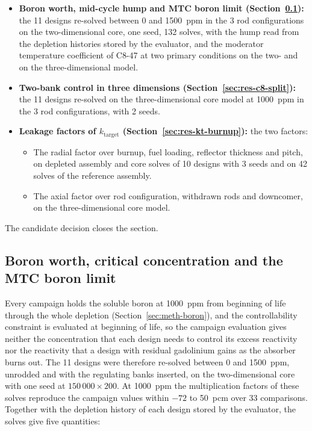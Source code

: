 \begin{itemize}
\item \textbf{Boron worth, mid-cycle hump and MTC boron limit
        (Section~\ref{sec:res-c8-boron}):} the 11 designs re-solved
        between 0 and \SI{1500}{ppm} in the 3 rod configurations on
        the two-dimensional core, one seed, 132 solves, with the hump read from the depletion histories stored by the evaluator, and the moderator
        temperature coefficient of C8-47 at two primary conditions on
        the two- and on the three-dimensional model.

\item \textbf{Two-bank control in three dimensions
        (Section~\ref{sec:res-c8-split}):} the 11 designs re-solved
        on the three-dimensional core model at \SI{1000}{ppm} in the
        3 rod configurations, with 2 seeds.

\item \textbf{Leakage factors of $k_\mathrm{target}$
        (Section~\ref{sec:res-kt-burnup}):} the two factors:
        \begin{itemize}
          \item The radial factor over burnup, fuel loading, reflector
                thickness and pitch, on depleted assembly and core solves
                of 10 designs with 3 seeds and on 42 solves of the
                reference assembly.
          \item The axial factor over rod configuration, withdrawn rods
                and downcomer, on the three-dimensional core model.
        \end{itemize}
\end{itemize}

The candidate decision closes the section.

\subsection{Boron worth, critical concentration and the MTC boron limit}
\label{sec:res-c8-boron}

Every campaign holds the soluble boron at \SI{1000}{ppm} from beginning
of life through the whole depletion (Section~\ref{sec:meth-boron}), and
the controllability constraint is evaluated at beginning of life, so the campaign evaluation gives neither the concentration that each design needs to
control its excess reactivity nor the reactivity that a design with
residual gadolinium gains as the absorber burns out. The 11 designs
were therefore re-solved between 0 and \SI{1500}{ppm}, unrodded and
with the regulating banks inserted, on the two-dimensional core with
one seed at $150\,000\times200$. At \SI{1000}{ppm} the multiplication factors of these solves reproduce the campaign values within $-72$ to \SI{+50}{pcm} over 33 comparisons. Together with the depletion history of each design stored by the evaluator, the solves give five quantities:

